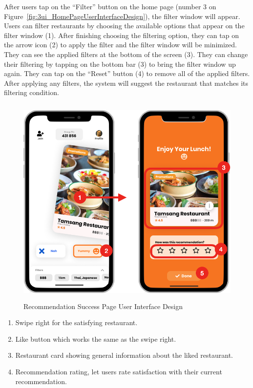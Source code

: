 \documentclass[12pt,oneside,openright,a4paper]{cpe-english-project}
\begin{document}
After users tap on the “Filter” button on the home page (number 3 on Figure~\ref{fig:3ui_HomePageUserInterfaceDesign}), the filter window will appear. Users can filter restaurants by choosing the available options that appear on the filter window (1). After finishing choosing the filtering option, they can tap on the arrow icon (2) to apply the filter and the filter window will be minimized. They can see the applied filters at the bottom of the screen (3). They can change their filtering by tapping on the bottom bar (3) to bring the filter window up again. They can tap on the “Reset” button (4) to remove all of the applied filters. After applying any filters, the system will suggest the restaurant that matches its filtering condition.

\newpage
\begin{figure}[H]\centering
\includegraphics[height=300pt]{./images/3ui_RecommendationSuccessPageUserInterfaceDesign.png}
\caption{Recommendation Success Page User Interface Design}\label{fig:3ui_RecommendationSuccessPageUserInterfaceDesign}
\end{figure}

\begin{enumerate}
\item Swipe right for the satisfying restaurant.
\item Like button which works the same as the swipe right.
\item Restaurant card showing general information about the liked restaurant.
\item Recommendation rating, let users rate satisfaction with their current recommendation.
\end{enumerate}
\end{document}
